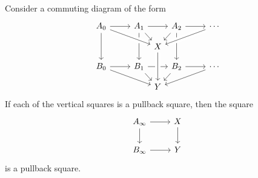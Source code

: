 \begin{cor}
Consider a commuting diagram of the form
\begin{equation*}
\begin{tikzcd}[column sep=small,row sep=small]
A_0 \arrow[rr] \arrow[dd] & & A_1 \arrow[rr] \arrow[dr] \arrow[dd] &[-.9em] &[-.9em] A_2 \arrow[dl] \arrow[dd] & & \cdots \\
& & & X \arrow[from=ulll,crossing over] \arrow[from=urrr,crossing over] \arrow[from=ur,to=urrr] \\
B_0 \arrow[rr] \arrow[drrr] & & B_1 \arrow[rr] \arrow[dr] & & B_2 \arrow[rr] \arrow[dl] & & \cdots \arrow[dlll] \\
& & & Y \arrow[from=uu,crossing over] 
\end{tikzcd}
\end{equation*}
If each of the vertical squares is a pullback square, then the square
\begin{equation*}
\begin{tikzcd}
A_\infty \arrow[r] \arrow[d] & X \arrow[d] \\
B_\infty \arrow[r] & Y
\end{tikzcd}
\end{equation*} 
is a pullback square.
\end{cor}


